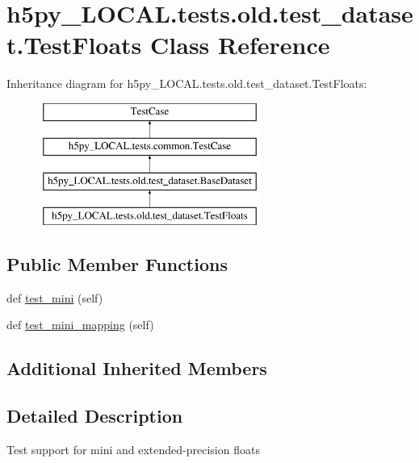 \hypertarget{classh5py__LOCAL_1_1tests_1_1old_1_1test__dataset_1_1TestFloats}{}\section{h5py\+\_\+\+L\+O\+C\+A\+L.\+tests.\+old.\+test\+\_\+dataset.\+Test\+Floats Class Reference}
\label{classh5py__LOCAL_1_1tests_1_1old_1_1test__dataset_1_1TestFloats}
Inheritance diagram for h5py\+\_\+\+L\+O\+C\+A\+L.\+tests.\+old.\+test\+\_\+dataset.\+Test\+Floats\+:\begin{figure}[H]
\begin{center}
\leavevmode
\includegraphics[height=4.000000cm]{classh5py__LOCAL_1_1tests_1_1old_1_1test__dataset_1_1TestFloats}
\end{center}
\end{figure}
\subsection*{Public Member Functions}
\begin{DoxyCompactItemize}
\item 
def \hyperlink{classh5py__LOCAL_1_1tests_1_1old_1_1test__dataset_1_1TestFloats_a62129aa285098c81c72231e71c25f485}{test\+\_\+mini} (self)
\item 
def \hyperlink{classh5py__LOCAL_1_1tests_1_1old_1_1test__dataset_1_1TestFloats_ae03c959e1224d27f8522d1d4e01f180c}{test\+\_\+mini\+\_\+mapping} (self)
\end{DoxyCompactItemize}
\subsection*{Additional Inherited Members}


\subsection{Detailed Description}
\begin{DoxyVerb}    Test support for mini and extended-precision floats
\end{DoxyVerb}
 

